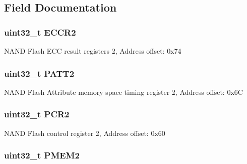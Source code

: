 \subsection{Field Documentation}
\hypertarget{struct_f_s_m_c___bank2___type_def_a05a47a1664adc7a3db3fa3e83fe883b4}{
\subsubsection[{E\-C\-C\-R2}]{ uint32\-\_\-t E\-C\-C\-R2}}\label{struct_f_s_m_c___bank2___type_def_a05a47a1664adc7a3db3fa3e83fe883b4}
N\-A\-N\-D Flash E\-C\-C result registers 2, Address offset\-: 0x74 \hypertarget{struct_f_s_m_c___bank2___type_def_a9c1bc909ec5ed32df45444488ea6668b}{
\subsubsection[{P\-A\-T\-T2}]{ uint32\-\_\-t P\-A\-T\-T2}}\label{struct_f_s_m_c___bank2___type_def_a9c1bc909ec5ed32df45444488ea6668b}
N\-A\-N\-D Flash Attribute memory space timing register 2, Address offset\-: 0x6\-C \hypertarget{struct_f_s_m_c___bank2___type_def_ab0cb1d704ee64c62ad5be55522a2683a}{
\subsubsection[{P\-C\-R2}]{ uint32\-\_\-t P\-C\-R2}}\label{struct_f_s_m_c___bank2___type_def_ab0cb1d704ee64c62ad5be55522a2683a}
N\-A\-N\-D Flash control register 2, Address offset\-: 0x60 \hypertarget{struct_f_s_m_c___bank2___type_def_a2e5a7a96de68a6612affa6df8c309c3d}{
\subsubsection[{P\-M\-E\-M2}]{ uint32\-\_\-t P\-M\-E\-M2}}\label{struct_f_s_m_c___bank2___type_def_a2e5a7a96de68a6612affa6df8c309c3d}
